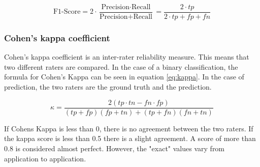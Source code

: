 \begin{equation}
    \label{eq:f1_score}
    \text{F1-Score} = 2 \cdot \frac{\text{Precision} \cdot \text{Recall}}{\text{Precision} + \text{Recall}} = \frac{2 \cdot tp}{2 \cdot tp + fp + fn}
\end{equation}

\subsubsection{Cohen's kappa coefficient}

Cohen's kappa coefficient is an inter-rater reliability measure\cite{kappa}. This means that two different raters are compared. In the case of a binary classification, the formula for Cohen's Kappa can be seen in equation \ref{eq:kappa}. In the case of prediction, the two raters are the ground truth and the prediction.

\begin{equation}
    \label{eq:kappa}
    \kappa = \frac{2(tp \cdot tn - fn \cdot fp)}{(tp + fp)(fp+tn) + (tp + fn)(fn + tn)}
\end{equation}

If Cohens Kappa is less than 0, there is no agreement between the two raters. If the kappa score is less than 0.5 there is a slight agreement. A score of more than 0.8 is considered almost perfect. However, the "exact" values vary from application to application.
